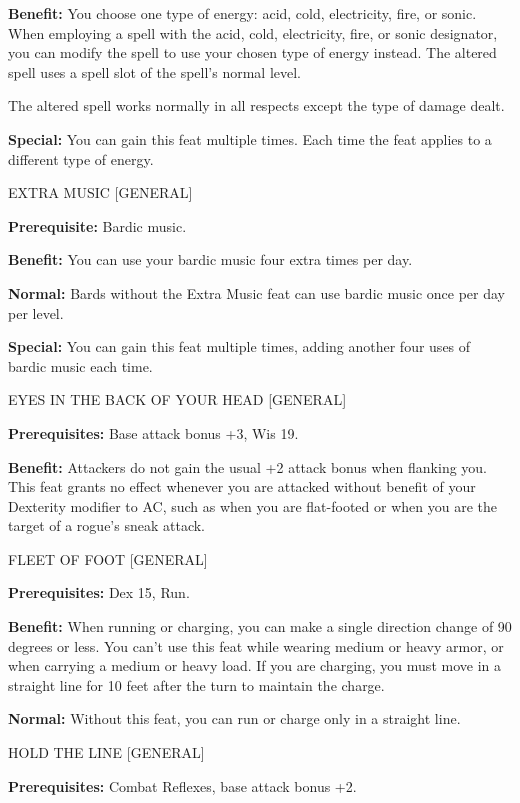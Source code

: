\documentclass{article}
\begin{document}
\textbf{Benefit:} You choose one type of energy: acid, cold, electricity, fire, 
or sonic. When employing a spell with the acid, cold, electricity, fire, or sonic 
designator, you can modify the spell to use your chosen type of energy instead. 
The altered spell uses a spell slot of the spell's normal level.

The altered spell works normally in all respects except the type of damage dealt. 

\textbf{Special: }You can gain this feat multiple times. Each time the feat applies 
to a different type of energy.

\vspace{12pt}
EXTRA MUSIC [GENERAL]

\textbf{Prerequisite:} Bardic music.

\textbf{Benefit:} You can use your bardic music four extra times per day.

\textbf{Normal:} Bards without the Extra Music feat can use bardic music once per 
day per level.

\textbf{Special: }You can gain this feat multiple times, adding another four uses 
of bardic music each time.

\vspace{12pt}
EYES IN THE BACK OF YOUR HEAD [GENERAL]

\textbf{Prerequisites:} Base attack bonus +3, Wis 19.

\textbf{Benefit:} Attackers do not gain the usual +2 attack bonus when flanking 
you. This feat grants no effect whenever you are attacked without benefit of your 
Dexterity modifier to AC, such as when you are flat-footed or when you are the 
target of a rogue's sneak attack.

\vspace{12pt}
FLEET OF FOOT [GENERAL]

\textbf{Prerequisites:} Dex 15, Run.

\textbf{Benefit:} When running or charging, you can make a single direction change 
of 90 degrees or less. You can't use this feat while wearing medium or heavy armor, 
or when carrying a medium or heavy load.  If you are charging, you must move in 
a straight line for 10 feet after the turn to maintain the charge.

\textbf{Normal:} Without this feat, you can run or charge only in a straight line.

\vspace{12pt}
HOLD THE LINE [GENERAL]

\textbf{Prerequisites:} Combat Reflexes, base attack bonus +2.
\end{document}
